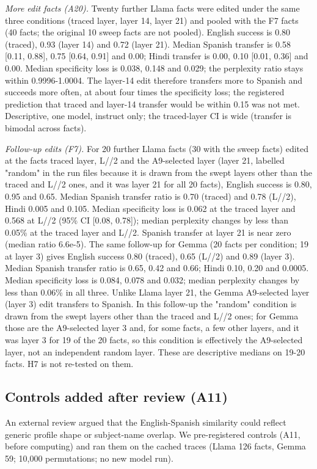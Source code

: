 \documentclass[11pt]{article}
\begin{document}
\emph{More edit facts (A20).} Twenty further Llama facts were edited under the same three conditions (traced layer, layer 14, layer 21) and pooled with the F7 facts (40 facts; the original 10 sweep facts are not pooled). English success is 0.80 (traced), 0.93 (layer 14) and 0.72 (layer 21). Median Spanish transfer is 0.58 {[}0.11, 0.88{]}, 0.75 {[}0.64, 0.91{]} and 0.00; Hindi transfer is 0.00, 0.10 {[}0.01, 0.36{]} and 0.00. Median specificity loss is 0.038, 0.148 and 0.029; the perplexity ratio stays within 0.9996-1.0004. The layer-14 edit therefore transfers more to Spanish and succeeds more often, at about four times the specificity loss; the registered prediction that traced and layer-14 transfer would be within 0.15 was not met. Descriptive, one model, instruct only; the traced-layer CI is wide (transfer is bimodal across facts).

\emph{Follow-up edits (F7).} For 20 further Llama facts (30 with the sweep facts) edited at the fact\textquotesingle s traced layer, L//2 and the A9-selected layer (layer 21, labelled "random" in the run files because it is drawn from the swept layers other than the traced and L//2 ones, and it was layer 21 for all 20 facts), English success is 0.80, 0.95 and 0.65. Median Spanish transfer ratio is 0.70 (traced) and 0.78 (L//2), Hindi 0.005 and 0.105. Median specificity loss is 0.062 at the traced layer and 0.568 at L//2 (95\% CI {[}0.08, 0.78{]}); median perplexity changes by less than 0.05\% at the traced layer and L//2. Spanish transfer at layer 21 is near zero (median ratio 6.6e-5). The same follow-up for Gemma (20 facts per condition; 19 at layer 3) gives English success 0.80 (traced), 0.65 (L//2) and 0.89 (layer 3). Median Spanish transfer ratio is 0.65, 0.42 and 0.66; Hindi 0.10, 0.20 and 0.0005. Median specificity loss is 0.084, 0.078 and 0.032; median perplexity changes by less than 0.06\% in all three. Unlike Llama layer 21, the Gemma A9-selected layer (layer 3) edit transfers to Spanish. In this follow-up the "random" condition is drawn from the swept layers other than the traced and L//2 ones; for Gemma those are the A9-selected layer 3 and, for some facts, a few other layers, and it was layer 3 for 19 of the 20 facts, so this condition is effectively the A9-selected layer, not an independent random layer. These are descriptive medians on 19-20 facts. H7 is not re-tested on them.

\subsection{Controls added after review (A11)}
An external review argued that the English-Spanish similarity could reflect generic profile shape or subject-name overlap. We pre-registered controls (A11, before computing) and ran them on the cached traces (Llama 126 facts, Gemma 59; 10,000 permutations; no new model run).
\end{document}
